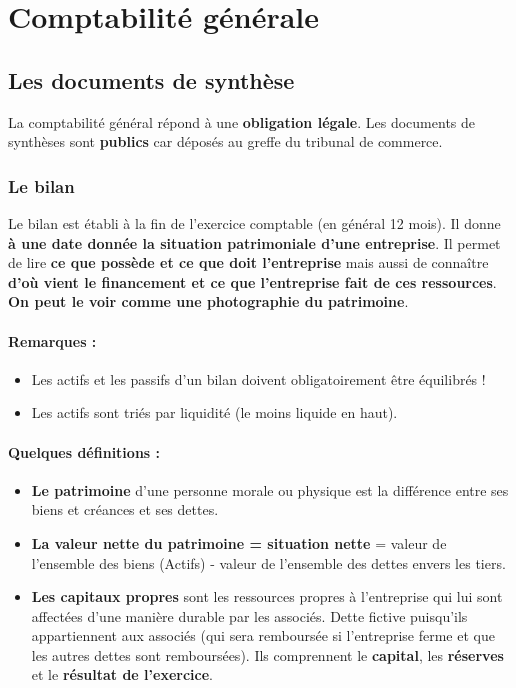 \section{Comptabilité générale}
\subsection{Les documents de synthèse}
La comptabilité général répond à une \textbf{obligation légale}. Les documents de synthèses sont \textbf{publics} car déposés au greffe du tribunal de commerce.

\subsubsection{Le bilan}
Le bilan est établi à la fin de l'exercice comptable (en général 12 mois). Il donne \textbf{à une date donnée la situation patrimoniale d'une entreprise}. Il permet de lire \textbf{ce que possède et ce que doit l'entreprise} mais aussi de conna\^itre \textbf{d'où vient le financement et ce que l'entreprise fait de ces ressources}. \textbf{On peut le voir comme une photographie du patrimoine}.\\

\paragraph{Remarques :}
\begin{itemize}
	\item Les actifs et les passifs d'un bilan doivent obligatoirement être équilibrés !
	\item Les actifs sont triés par liquidité (le moins liquide en haut).
\end{itemize}

\paragraph{Quelques définitions :}
\begin{itemize}

	\item \textbf{Le patrimoine} d'une personne morale ou physique est la différence entre ses biens et créances et ses dettes.
	
	\item \textbf{La valeur nette du patrimoine = situation nette} = valeur de l'ensemble des biens (Actifs) - valeur de l'ensemble des dettes envers les tiers.
	
	\item \textbf{Les capitaux propres} sont les ressources propres à l'entreprise qui lui sont affectées d'une manière durable par les associés. Dette fictive puisqu'ils appartiennent aux associés (qui sera remboursée si l'entreprise ferme et que les autres dettes sont remboursées). Ils comprennent le \textbf{capital}, les \textbf{réserves} et le \textbf{résultat de l'exercice}.
	
\end{itemize}

